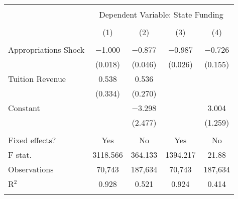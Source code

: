
\begin{tabular}{@{\extracolsep{5pt}}lcccc} 
\\[-1.8ex]\hline 
\hline \\[-1.8ex] 
 & \multicolumn{4}{c}{Dependent Variable: State Funding} \\ 
\cline{2-5} 
\\[-1.8ex] & (1) & (2) & (3) & (4)\\ 
\hline \\[-1.8ex] 
 Appropriations Shock & $-$1.000 & $-$0.877 & $-$0.987 & $-$0.726 \\ 
  & (0.018) & (0.046) & (0.026) & (0.155) \\ 
  Tuition Revenue & 0.538 & 0.536 &  &  \\ 
  & (0.334) & (0.270) &  &  \\ 
  Constant &  & $-$3.298 &  & 3.004 \\ 
  &  & (2.477) &  & (1.259) \\ 
 \hline \\[-1.8ex] 
Fixed effects? & Yes & No & Yes & No \\ 
F stat. & 3118.566 & 364.133 & 1394.217 & 21.88 \\ 
Observations & 70,743 & 187,634 & 70,743 & 187,634 \\ 
R$^{2}$ & 0.928 & 0.521 & 0.924 & 0.414 \\ 
\hline 
\hline \\[-1.8ex] 
\end{tabular} 
